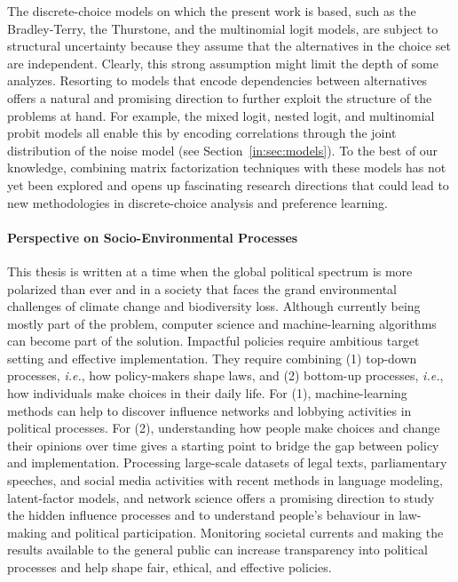 The discrete-choice models on which the present work is based, such as the Bradley-Terry, the Thurstone, and the multinomial logit models, are subject to structural uncertainty because they assume that the alternatives in the choice set are independent.
Clearly, this strong assumption might limit the depth of some analyzes.
Resorting to models that encode dependencies between alternatives offers a natural and promising direction to further exploit the structure of the problems at hand.
For example, the mixed logit, nested logit, and multinomial probit models all enable this by encoding correlations through the joint distribution of the noise model (see Section~\ref{in:sec:models}).
To the best of our knowledge, combining matrix factorization techniques with these models has not yet been explored and opens up fascinating research directions that could lead to new methodologies in discrete-choice analysis and preference learning.

\paragraph{Perspective on Socio-Environmental Processes}

This thesis is written at a time when the global political spectrum is more polarized than ever and in a society that faces the grand environmental challenges of climate change and biodiversity loss.
Although currently being mostly part of the problem, computer science and machine-learning algorithms can become part of the solution.
Impactful policies require ambitious target setting and effective implementation.
They require combining (1) top-down processes, \textit{i.e.}, how policy-makers shape laws, and (2) bottom-up processes, \textit{i.e.}, how individuals make choices in their daily life.
For (1), machine-learning methods can help to discover influence networks and lobbying activities in political processes.
For (2), understanding how people make choices and change their opinions over time gives a starting point to bridge the gap between policy and implementation.
Processing large-scale datasets of legal texts, parliamentary speeches, and social media activities with recent methods in language modeling, latent-factor models, and network science offers a promising direction to study the hidden influence processes and to understand people's behaviour in law-making and political participation.
Monitoring societal currents and making the results available to the general public can increase transparency into political processes and help shape fair, ethical, and effective policies.

